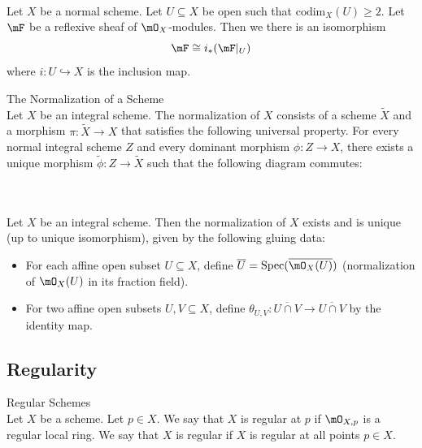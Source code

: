 \documentclass[a4paper]{article}
\begin{document}
\begin{prp}{}{}\\
Let $X$ be a normal scheme. Let $U\subseteq X$ be open such that $\text{codim}_X(U)\geq 2$. Let $\mF$ be a reflexive sheaf of $\mO_X$-modules. Then we there is an isomorphism $$\mF\cong i_\ast(\mF|_U)$$ where $i:U\hookrightarrow X$ is the inclusion map. 
\end{prp}

\begin{defn}{The Normalization of a Scheme}{}\\
Let $X$ be an integral scheme. The normalization of $X$ consists of a scheme $\widetilde{X}$ and a morphism $\pi:\widetilde{X}\to X$ that satisfies the following universal property. For every normal integral scheme $Z$ and every dominant morphism $\phi:Z\to X$, there exists a unique morphism $\widetilde{\phi}:Z\to\widetilde{X}$ such that the following diagram commutes: \\
 \\
\end{defn}

\begin{prp}{}{}\\
Let $X$ be an integral scheme. Then the normalization of $X$ exists and is unique (up to unique isomorphism), given by the following gluing data: 
\begin{itemize}
\item For each affine open subset $U\subseteq X$, define $\overline{U}=\text{Spec}(\overline{\mO_X(U)})$ (normalization of $\mO_X(U)$ in its fraction field). 
\item For two affine open subsets $U,V\subseteq X$, define $\theta_{U,V}:\overline{U\cap V}\to\overline{U\cap V}$ by the identity map. 
\end{itemize}
\end{prp}

\subsection{Regularity}
\begin{defn}{Regular Schemes}{}\\
Let $X$ be a scheme. Let $p\in X$. We say that $X$ is regular at $p$ if $\mO_{X,p}$ is a regular local ring. We say that $X$ is regular if $X$ is regular at all points $p\in X$. 
\end{defn}
\end{document}
